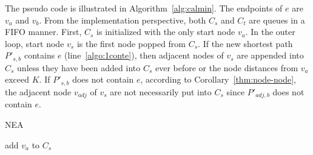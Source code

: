 The pseudo code is illustrated in Algorithm~\ref{alg:calmin}.
The endpoints of $e$ are $v_a$ and $v_b$.
From the implementation perspective, both $C_s$ and $C_t$ are queues in a FIFO manner.
First, $C_s$ is initialized with the only start node $v_a$.
In the outer loop, start node $v_s$ is the first node popped from $C_s$.
If the new shortest path $P'_{s,b}$ contains $e$ (line~\ref{algo:1conte}), then adjacent nodes of $v_s$ are appended into $C_s$ unless they have been added into $C_s$ ever before or the node distances from $v_a$ exceed $K$. If $P'_{s,b}$ does not contain $e$, according to Corollary~\ref{thm:node-node}, the adjacent node $v_{adj}$ of $v_s$ are not necessarily put into $C_s$ since $P'_{{adj},b}$ does not contain $e$.
\begin{algorithm}[htbp]
{\small
    \caption{NEA}
    \label{alg:calmin}

   add $v_a$ to $C_s$\;

  \Return{$\Psi$;}

}
\end{algorithm}

